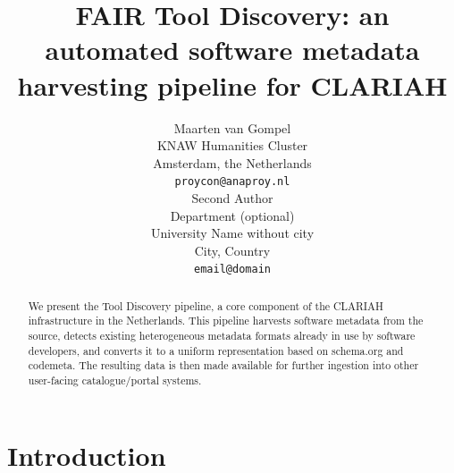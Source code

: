 \documentclass[a4paper,11pt]{article}
\title{FAIR Tool Discovery: an automated software metadata harvesting pipeline for CLARIAH}
\author{Maarten van Gompel \\
  KNAW Humanities Cluster \\
  Amsterdam, the Netherlands \\
  {\tt proycon@anaproy.nl} \\\And %
  Second Author \\
  Department (optional)\\
  University Name without city \\
  City, Country \\
 {\tt email@domain} \\
}
\date{}
\begin{document}
\maketitle
\begin{abstract}
  We present the Tool Discovery pipeline, a core component of the CLARIAH
    infrastructure in the Netherlands. This pipeline harvests software metadata
    from the source, detects existing heterogeneous metadata formats already in
    use by software developers, and converts it to a uniform representation
    based on schema.org and codemeta. The resulting data is then made available
    for further ingestion into other user-facing catalogue/portal systems. 
\end{abstract}

\section{Introduction} \label{intro}

%

\end{document}
